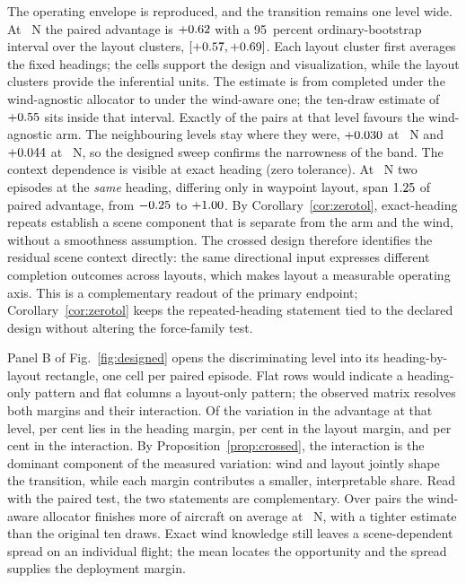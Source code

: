 The operating envelope is reproduced, and the transition remains one level wide.
At \KneeLevel{}~N the paired
advantage is $+0.62{}$ with a 95~percent ordinary-bootstrap
interval over the \NCrossedClusters{} layout clusters,
$[+0.57{}, +0.69{}]$. Each layout cluster first
averages the \NAssignedHeadings{} fixed headings; the \NPairsPerForce{} cells
support the design and visualization, while the layout clusters provide the
inferential units. The estimate is from
\DesignedKneeAgnostic{} completed under the wind-agnostic allocator to
\DesignedKneeAware{} under the wind-aware one; the ten-draw estimate of
$+0.55{}$ sits inside that interval. Exactly \DesignedKneeAdverse{} of the
\NPairsPerForce{} pairs at that level favours the wind-agnostic arm. The
neighbouring levels stay where they were, $+0.030{}$ at
\SaturationLevel{}~N and $+0.044{}$ at \CollapseLevel{}~N, so
the designed sweep confirms the narrowness of the band.
The context dependence is visible at exact heading (zero tolerance). At
\KneeLevel{}~N two episodes at the \emph{same} heading, differing only in
waypoint layout, span $1.25{}$ of paired advantage, from
$-0.25{}$ to $+1.00{}$. By
Corollary~\ref{cor:zerotol}, exact-heading repeats establish a scene component
that is separate from the arm and the wind, without a smoothness assumption.
The crossed design therefore identifies the residual scene context directly:
the same directional input expresses different completion outcomes across
layouts, which makes layout a measurable operating axis.
This is a complementary readout of the primary endpoint; Corollary~\ref{cor:zerotol}
keeps the repeated-heading statement tied to the declared design without altering
the force-family test.

Panel B of Fig.~\ref{fig:designed} opens the discriminating level into
its heading-by-layout rectangle, one cell per paired episode. Flat rows would
indicate a heading-only pattern and flat columns a layout-only pattern; the
observed matrix resolves both margins and their interaction. Of the variation in
the advantage at that level, \DesignedShareHeading{} per cent lies in the heading
margin, \DesignedShareScene{} per cent in the layout margin, and
\DesignedShareResidual{} per cent in the interaction. By
Proposition~\ref{prop:crossed}, the interaction is the dominant component of the
measured variation: wind and layout jointly shape the transition, while each
margin contributes a smaller, interpretable share.
Read with the paired test, the two statements are complementary. Over
\NPairsPerForce{} pairs the wind-aware allocator finishes
\DesignedKneeDelta{} more of \NDrones{} aircraft on average at \KneeLevel{}~N,
with a tighter estimate than the original ten draws. Exact wind knowledge still
leaves a scene-dependent spread on an individual flight; the mean locates the
opportunity and the spread supplies the deployment margin.

